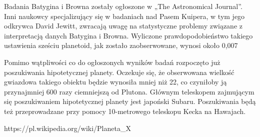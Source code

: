 \documentclass[12pt]{article}
\begin{document}
Badania Batygina i Browna zostały ogłoszone w „The Astronomical Journal”. Inni naukowcy specjalizujący się w badaniach nad Pasem Kuipera, w tym jego odkrywca David Jewitt, zwracają uwagę na statystyczne problemy związane z interpretacją danych Batygina i Browna. Wyliczone prawdopodobieństwo takiego ustawienia sześciu planetoid, jak zostało zaobserwowane, wynosi około 0,007%

Pomimo wątpliwości co do ogłoszonych wyników badań rozpoczęto już poszukiwania hipotetycznej planety. Oczekuje się, że obserwowana wielkość gwiazdowa takiego obiektu będzie wynosiła mniej niż 22, co czyniłoby ją przynajmniej 600 razy ciemniejszą od Plutona. Głównym teleskopem zajmującym się poszukiwaniem hipotetycznej planety jest japoński Subaru. Poszukiwania będą też przeprowadzane przy pomocy 10-metrowego teleskopu Kecka na Hawajach.\\

\begin{thebibliography}{9}

	https://pl.wikipedia.org/wiki/Planeta_X
\end{thebibliography}
\end{document}
